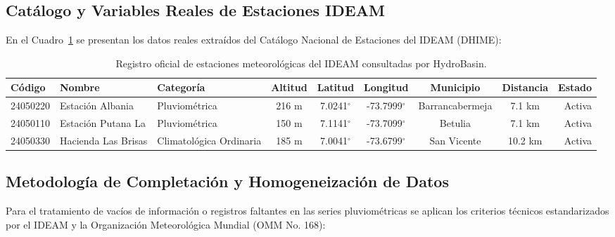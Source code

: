 \documentclass[11pt,a4paper]{article}
\begin{document}
\subsection*{Catálogo y Variables Reales de Estaciones IDEAM}
En el Cuadro~\ref{tab:anexo_ideam} se presentan los datos reales extraídos del Catálogo Nacional de Estaciones del IDEAM (DHIME):

\begin{table}[H]
\centering
\caption{Registro oficial de estaciones meteorológicas del IDEAM consultadas por HydroBasin.}
\label{tab:anexo_ideam}
\begin{tabular}{lllcccccr}\toprule
\textbf{Código} & \textbf{Nombre} & \textbf{Categoría} & \textbf{Altitud} & \textbf{Latitud} & \textbf{Longitud} & \textbf{Municipio} & \textbf{Distancia} & \textbf{Estado} \\\midrule
24050220 & Estación Albania & Pluviométrica & 216 m & 7.0241$^\circ$ & -73.7999$^\circ$ & Barrancabermeja & 7.1 km & Activa \\
24050110 & Estación Putana La & Pluviométrica & 150 m & 7.1141$^\circ$ & -73.7099$^\circ$ & Betulia & 7.1 km & Activa \\
24050330 & Hacienda Las Brisas & Climatológica Ordinaria & 185 m & 7.0041$^\circ$ & -73.6799$^\circ$ & San Vicente & 10.2 km & Activa \\
\bottomrule
\end{tabular}
\end{table}

\subsection*{Metodología de Completación y Homogeneización de Datos}
Para el tratamiento de vacíos de información o registros faltantes en las series pluviométricas se aplican los criterios técnicos estandarizados por el IDEAM y la Organización Meteorológica Mundial (OMM No. 168):
\end{document}
